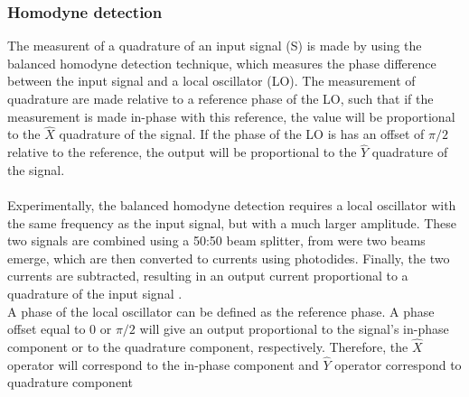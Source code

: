\subsubsection{Homodyne detection}

The measurent of a quadrature of an input signal (S) is made by using the balanced homodyne detection technique, which measures the phase difference between the input signal and a local oscillator (LO). The measurement of quadrature are made relative to a reference phase of the LO, such that if the measurement is made in-phase with this reference, the value will be proportional to the $\hat{X}$ quadrature of the signal. If the phase of the LO is has an offset of $\pi/2$ relative to the reference, the output will be proportional to the $\hat{Y}$ quadrature of the signal.\\
\\
Experimentally, the balanced homodyne detection requires a local oscillator with the same frequency as the input signal, but with a much larger amplitude. These two signals are combined using a 50:50 beam splitter, from were two beams emerge, which are then converted to currents using photodides. Finally, the two currents are subtracted, resulting in an output current proportional to a quadrature of the input signal
\cite{fox2006}.\\
%
A phase of the local oscillator can be defined as the reference phase. A phase offset equal to $0$ or $\pi/2$ will give an output proportional to the signal's in-phase component or to the quadrature component, respectively. Therefore, the $\hat{X}$ operator will correspond to the in-phase component and $\hat{Y}$ operator correspond to quadrature component
\\
%
